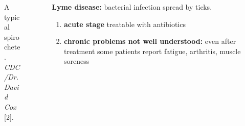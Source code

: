 \documentclass[usenames,dvipsnames,15pt]{beamer}
\begin{document}
\begin{frame}
\begin{columns}
\begin{column}{.25\textwidth}
\begin{figure}
        {\tiny A typical spirochete.\\\vspace{-.2cm}\emph{CDC/Dr. David Cox} [2].}
      \end{figure}
    \end{column}
    \begin{column}{.75\textwidth}
      \vspace{0cm}

      {\bf Lyme disease:} bacterial infection spread by ticks.
      \begin{enumerate}
      \item {\bf acute stage} treatable with antibiotics
      \item {\bf chronic problems not well understood:} \alert{even after treatment} some patients report fatigue, arthritis, muscle soreness
      \end{enumerate}
      
          
    \end{column}
  \end{columns}
\end{frame}
\end{document}
